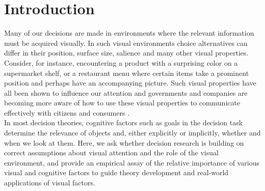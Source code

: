 
\section{Introduction}

Many of our decisions are made in environments where the relevant information must be acquired visually. In such visual environments choice alternatives can differ in their position, surface size, salience and many other visual properties. Consider, for instance, encountering a product with a surprising color on a supermarket shelf, or a restaurant menu where certain items take a prominent position and perhaps have an accompanying picture. Such visual properties have all been shown to influence our attention \citep{corbetta2002a,borji2012a,dehaene2003a,clarke2014a, rosenholtz2007a} and governments and companies are becoming more aware of how to use these visual properties to communicate effectively with citizens and consumers \citep{orquinwedel2020}. \\

  In most decision theories, cognitive factors such as goals in the decision task determine the relevance of objects and, either explicitly or implicitly, whether and when we look at them. Here, we ask whether decision research is building on correct assumptions about visual attention and the role of the visual environment, and provide an empirical assay of the relative importance of various visual and cognitive factors to guide theory development and real-world applications of visual factors.\\


